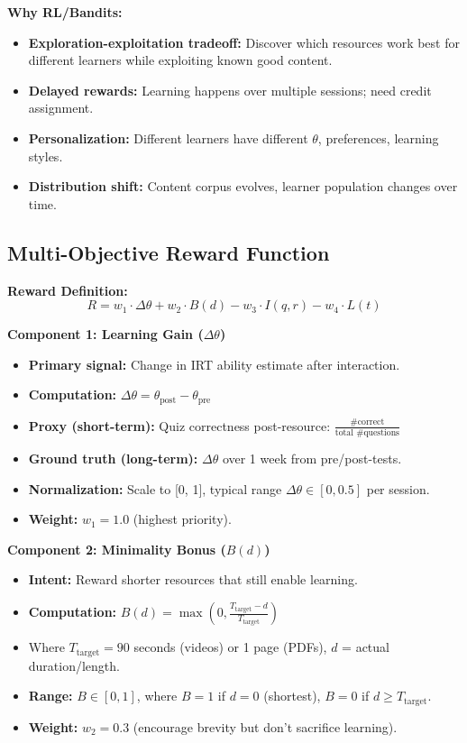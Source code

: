 \documentclass[11pt,letterpaper]{article}
\begin{document}
\textbf{Why RL/Bandits:}
\begin{itemize}
\item \textbf{Exploration-exploitation tradeoff:} Discover which resources work best for different learners while exploiting known good content.
\item \textbf{Delayed rewards:} Learning happens over multiple sessions; need credit assignment.
\item \textbf{Personalization:} Different learners have different $\theta$, preferences, learning styles.
\item \textbf{Distribution shift:} Content corpus evolves, learner population changes over time.
\end{itemize}

\subsection{Multi-Objective Reward Function}

\textbf{Reward Definition:}
\[
R = w_1 \cdot \Delta\theta + w_2 \cdot B(d) - w_3 \cdot I(q, r) - w_4 \cdot L(t)
\]

\textbf{Component 1: Learning Gain ($\Delta\theta$)}
\begin{itemize}
\item \textbf{Primary signal:} Change in IRT ability estimate after interaction.
\item \textbf{Computation:} $\Delta\theta = \theta_{\text{post}} - \theta_{\text{pre}}$
\item \textbf{Proxy (short-term):} Quiz correctness post-resource: $\frac{\text{\# correct}}{\text{total \# questions}}$
\item \textbf{Ground truth (long-term):} $\Delta\theta$ over 1 week from pre/post-tests.
\item \textbf{Normalization:} Scale to [0, 1], typical range $\Delta\theta \in [0, 0.5]$ per session.
\item \textbf{Weight:} $w_1 = 1.0$ (highest priority).
\end{itemize}

\textbf{Component 2: Minimality Bonus ($B(d)$)}
\begin{itemize}
\item \textbf{Intent:} Reward shorter resources that still enable learning.
\item \textbf{Computation:} $B(d) = \max\left(0, \frac{T_{\text{target}} - d}{T_{\text{target}}}\right)$
\item Where $T_{\text{target}} = 90$ seconds (videos) or 1 page (PDFs), $d$ = actual duration/length.
\item \textbf{Range:} $B \in [0, 1]$, where $B=1$ if $d=0$ (shortest), $B=0$ if $d \geq T_{\text{target}}$.
\item \textbf{Weight:} $w_2 = 0.3$ (encourage brevity but don't sacrifice learning).
\end{itemize}
\end{document}
